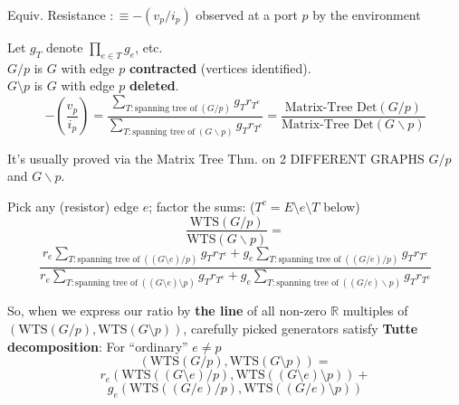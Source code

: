 \documentclass{beamer}
\newcommand{\Reals}{\ensuremath{\mathbb{R}}}
\begin{document}
\begin{frame}{Equiv. Resistance $ :\equiv -(v_p/i_p)$
observed at a port $p$ by the environment
}

\begin{theorem}
Let $g_T$ denote $\prod_{e\in T}g_e$, etc.\\
$G/p$ is $G$ with edge $p$ \textbf{contracted} (vertices identified).\\
$G\setminus p$ is $G$ with edge $p$ \textbf{deleted}.\\
\[
-(\frac{v_p}{i_p})=
\frac{\sum_{T:\text{spanning tree of}\;(G/p)}g_Tr_{T^c}}
{\sum_{T:\text{spanning tree of}\;(G\backslash p)}g_Tr_{T^c}}
= \frac{\mbox{Matrix-Tree Det}(G/p)}
       {\mbox{Matrix-Tree Det}(G\backslash p)}
\]
\end{theorem}

It's usually proved 
via the Matrix Tree Thm. on 2 DIFFERENT GRAPHS
$G/p$ and $G\backslash p$.  

\end{frame}

\begin{frame}
Pick any (resistor) edge $e$; factor the sums:
($T^c = E\setminus e \setminus T$ below)
\[
\frac{\mbox{WTS}(G/p)}
{\mbox{WTS}(G\backslash p)} 
=
\]
\[
\frac{r_e\sum_{T:\text{spanning tree of}\;((G\setminus e)/p)}g_Tr_{T^c}   
+g_e\sum_{T:\text{spanning tree of}\;((G/e)/p)}g_Tr_{T^c}   }
{r_e\sum_{T:\text{spanning tree of}\;((G\setminus e)\setminus p)}g_Tr_{T^c}
+g_e\sum_{T:\text{spanning tree of}\;((G/e)\backslash p)}g_Tr_{T^c}
}
\]

So, when we express our ratio by \textbf{the line} of all non-zero $\Reals$ 
multiples of $(\mbox{WTS}(G/p),\mbox{WTS}(G\setminus p))$, carefully picked 
generators satisfy \textbf{Tutte decomposition}: For 
``ordinary'' $e\neq p$
\[
(\mbox{WTS}(G/p),\mbox{WTS}(G\setminus p))
=
\]
\[
r_e(\mbox{WTS}((G\setminus e)/p),\mbox{WTS}((G\setminus e)\setminus p))
+
\]
\[
g_e(\mbox{WTS}((G/e)/p),\mbox{WTS}((G/e)\setminus p))
\]

\end{frame}
\end{document}
